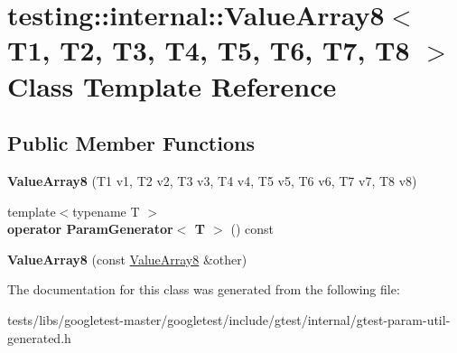 \hypertarget{classtesting_1_1internal_1_1ValueArray8}{}\section{testing\+:\+:internal\+:\+:Value\+Array8$<$ T1, T2, T3, T4, T5, T6, T7, T8 $>$ Class Template Reference}
\label{classtesting_1_1internal_1_1ValueArray8}
\subsection*{Public Member Functions}
\begin{DoxyCompactItemize}
\item 
\mbox{\label{classtesting_1_1internal_1_1ValueArray8_aa935d771149e26694277b6b9a3f6f5d3}} 
{\bfseries Value\+Array8} (T1 v1, T2 v2, T3 v3, T4 v4, T5 v5, T6 v6, T7 v7, T8 v8)
\item 
\mbox{\label{classtesting_1_1internal_1_1ValueArray8_a265f6e8bc6ceede7e673682ddebb82c5}} 
{\footnotesize template$<$typename T $>$ }\\{\bfseries operator Param\+Generator$<$ T $>$} () const
\item 
\mbox{\label{classtesting_1_1internal_1_1ValueArray8_aa2d57c811dc60c02a487c36b4b6b4464}} 
{\bfseries Value\+Array8} (const \hyperlink{classtesting_1_1internal_1_1ValueArray8}{Value\+Array8} \&other)
\end{DoxyCompactItemize}


The documentation for this class was generated from the following file\+:\begin{DoxyCompactItemize}
\item 
tests/libs/googletest-\/master/googletest/include/gtest/internal/gtest-\/param-\/util-\/generated.\+h\end{DoxyCompactItemize}
